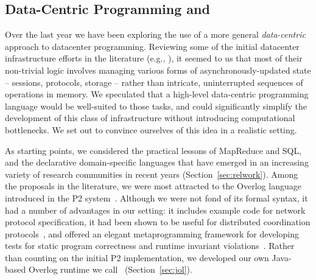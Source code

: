 \documentclass{sig-alternate}
\newcommand{\jmh}[1]{{\textcolor{red}{#1 -- jmh}}}
\begin{document}
% 
% 

\subsection{Data-Centric Programming and \BOOM}
Over the last year we have been exploring the use of a more general {\em data-centric} approach to datacenter programming. Reviewing some of the initial datacenter infrastructure efforts in the literature (e.g., \cite{mapreduce,gfs,chubby,dynamo}), it seemed to us that most of their non-trivial logic involves managing various forms of asynchronously-updated state -- sessions, protocols, storage -- rather than intricate, uninterrupted sequences of operations in memory.  We speculated that a high-level data-centric programming language would be well-suited to those tasks, and could significantly simplify the development of this class of infrastructure without introducing computational bottlenecks.  We set out to convince ourselves of this idea in a realistic setting.

As starting points, we considered the practical lessons of MapReduce and SQL, and the declarative domain-specific languages that have emerged in an increasing variety of research communities in recent years (Section~\ref{sec:relwork}).  
Among the proposals in the literature, we were most attracted to the Overlog language introduced in the P2 system~\cite{p2}.  Although we were not fond of its formal syntax, it had a number of advantages in our setting: it includes example code for network protocol specification, it had been shown to be useful for distributed coordination protocols~\cite{paxonp2}, and offered an elegant metaprogramming framework for developing tests for static program correctness and runtime invariant violations~\cite{evitaraced}.  Rather than counting on the initial P2 implementation, we developed our own Java-based Overlog runtime we call \JOL\ (Section~\ref{sec:jol}).
\end{document}
